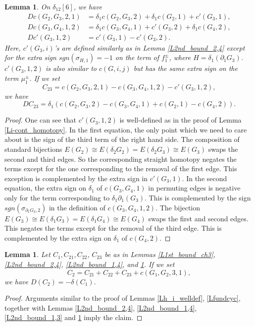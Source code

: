 \documentclass[reqno]{amsart}
\theoremstyle{definition}
\theoremstyle{plain}
\newtheorem{lem}[defi]{Lemma}
\begin{document}
\begin{lem}\label{L2nd_bound_1,2}
On $\delta_{12}[6]$, we have
\[
\begin{split}
Dc(G_2, G_3,2,1)& =\delta_1c(G_2,G_3,2)+\delta_1c(G_2,1)+c'(G_3,1), \\
Dc(G_3, G_4,1,2)& =\delta_1c(G_3,G_4,1)+c'(G_3,2)+\delta_1c(G_4,2), \\
Dc'(G_3,1,2)&=c'(G_3,1)-c'(G_3,2).
\end{split}
\]
Here, $c'(G_3,i)$'s are defined  similarly as in Lemma  \ref{L2nd_bound_2,4} except for the extra sign $sgn(\sigma_{H,1})=-1$ on the term of $f_1^{\pm}$, where $H=\delta_1(\partial_1G_3)$.  $c'(G_3,1,2)$ is also similar to $c(G,i,j)$ but has the same extra sign on the term $\mu_1^{\pm}$.
If we set 
\[
C_{23}=c(G_2,G_3,2,1)-c(G_3, G_4,1,2)-c'(G_3,1,2),
\]
we have
\[
DC_{23}=\delta_1(c(G_2,G_3,2)-c(G_3,G_4,1)+c(G_2,1)-c(G_4,2)).
\]



\end{lem}
\begin{proof}
One can see that $c'(G_3,1,2)$ is well-defined as in the proof of  Lemma \ref{Li-cont_homotopy}. In the first equation, the only point which we need to care about is the sign of the third term of the right hand side. The composition of standard bijections $E(G_2)\cong E(\delta_2G_2)= E(\delta_2G_3)\cong E(G_3)$ swaps the second and third edges. So the corresponding straight homotopy negates the terms except for the one corresponding to the removal of the first edge. This exception is complemented by the extra sign in $c'(G_3,1)$. In the second equation, the extra sign on $\delta_1$ of $c(G_3,G_4,1)$ in permuting edges is negative only for the term corresponding to $\delta_1\partial_1(G_3)$. This is complemented by the  sign $sgn(\sigma_{\partial_1G_3,2})$ in the definition of $c(G_3,G_4,1,2)$. The bijection $E(G_3)\cong E(\delta_1G_3)= E(\delta_1G_4)\cong E(G_4)$ swaps the first and second edges. This negates the terms except for the removal of the  third edge. This is complemented by the extra sign on $\delta_1$ of $c(G_4,2)$.
\end{proof}

\begin{lem}\label{L2nd_bound_all}
Let $C_1, C_{21}, C_{22}$, $C_{23}$ be as in Lemmas \ref{L1st_bound_ch3}, \ref{L2nd_bound_2,4}, \ref{L2nd_bound_1,4}, and \ref{L2nd_bound_1,2}. If we set 
\[
C_2=C_{21}+C_{22}+C_{23}+c(G_1,G_2,3,1),
\]
we have
$
D(C_2)=-\delta(C_1).
$ 
\end{lem}
\begin{proof}
Arguments similar to the proof of Lemmas \ref{Lh_i_welldef},  \ref{Lfundcyc}, together with Lemmas  \ref{L2nd_bound_2,4}, \ref{L2nd_bound_1,4},  \ref{L2nd_bound_1,3}
and \ref{L2nd_bound_1,2}  imply the claim.
\end{proof}
\end{document}

